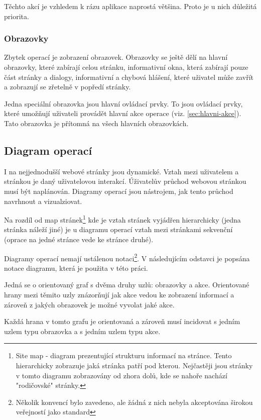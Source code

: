 Těchto akcí je vzhledem k rázu aplikace naprostá většina. Proto je u nich důležitá priorita.

\subsubsection{Obrazovky}
Zbytek operací je zobrazení obrazovek. Obrazovky se ještě dělí na hlavní obrazovky, které zabírají celou stránku, informativní okna, která zabírají pouze část stránky a dialogy, informativní a chybová hlášení, které uživatel může zavřít a zobrazují se zřetelně v popředí stránky.

Jedna speciální obrazovka jsou hlavní ovládací prvky. To jsou ovládací prvky, které umožňují uživateli provádět hlavní akce operace (viz. \ref{sec:hlavni-akce}). Tato obrazovka je přítomná na všech hlavních obrazovkách.

\subsection{Diagram operací}
I na nejjednodušší webové stránky jsou dynamické. Vztah mezi uživatelem a stránkou je daný uživatelovou interakcí. Úživatelův průchod webovou stránkou musí být naplánován. Diagramy operací jsou nástrojem, jak tento průchod navrhnout a vizualziovat\cite{brown2007communicating}.

Na rozdíl od map stránek\footnote{Site map - diagram prezentující strukturu informací na stránce. Tento hierarchicky zobrazuje jaká stránka patří pod kterou. Nejčastěji jsou stránky v tomto diagramu zobrazovány od zhora dolů, kde se nahoře nachází "rodičovské" stránky\cite{brown2007communicating}.} kde je vztah stránek vyjádřen hierarchicky (jedna stránka náleží jiné) je u diagramu operací vztah mezi stránkami sekvenční (oprace na jedné stránce vede ke stránce druhé)\cite{brown2007communicating}.

Diagramy operací nemají ustálenou notaci\footnote{Několik konvencí bylo zavedeno, ale žádná z nich nebyla akceptována širokou veřejností jako standard\cite{brown2007communicating}}. V následujícím odstavci je popsána notace diagramu, která je použita v této práci.  

Jedná se o orientovaný graf s dvěma druhy uzlů: obrazovky a akce. Orientované hrany mezi těmito uzly znázorňují jak akce vedou ke zobrazení informací a zároveň z jakých obrazovek je možné vyvolat jaké akce.

Každá hrana v tomto grafu je orientovaná a zároveň musí incidovat s jedním uzlem typu obrazovka a s jedním uzlem typu akce.

